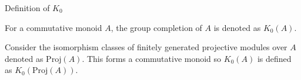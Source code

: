 \documentclass{beamer}
\begin{document}
\begin{frame}{Definition of $K_0$}
\begin{definition}
	For a commutative monoid $A$, the group completion of $A$ is denoted as $K_0(A).$
\end{definition}
\begin{definition}
	Consider the isomorphism classes of finitely generated projective modules over $A$ denoted as $\mathrm{Proj}(A)$. This forms a commutative monoid so $K_0(A)$ is defined as $K_0(\mathrm{Proj}(A))$.
\end{definition}



\end{frame}
\end{document}
